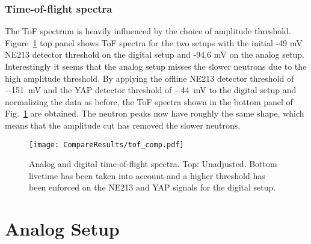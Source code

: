 \documentclass[main.tex]{subfiles}
\begin{document}
\subsubsection{Time-of-flight spectra}
The ToF spectrum is heavily influenced by the choice of amplitude threshold. Figure~\ref{fig:tof_comp} top panel shows ToF spectra for the two setups with the initial -49 mV NE213 detector threshold on the digital setup and -94.6 mV on the analog setup. Interestingly it seems that the analog setup misses the slower neutrons due to the high amplitude threshold. By applying the offline NE213 detector threshold of \SI{-151}{mV} and the YAP detector threshold of \SI{-44}{mV} to the digital setup and normalizing the data as before, the ToF spectra shown in the bottom panel of Fig.~\ref{fig:tof_comp} are obtained. The neutron peaks now have roughly the same shape, which means that the amplitude cut has removed the slower neutrons.

\begin{figure}[h]
    \centering
        \texttt{[image: CompareResults/tof\_comp.pdf]}
        \caption[Analog and digital time-of-flight spectra.]{Analog and digital time-of-flight spectra. Top: Unadjusted. Bottom livetime has been taken into account and a higher threshold has been enforced on the NE213 and YAP signals for the digital setup.}
    \label{fig:tof_comp}
\end{figure}

\section{Analog Setup}
\end{document}
